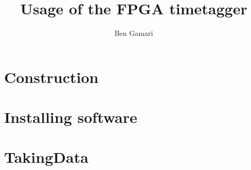 \documentclass{report}
\begin{document}
\title{Usage of the FPGA timetagger}
\author{Ben Gamari}
\maketitle

\chapter{Construction}
\label{Ch:Construction}


\chapter{Installing software}
\label{Ch:Installing}

\chapter{TakingData}
\label{Ch:TakingData}

\end{document}
